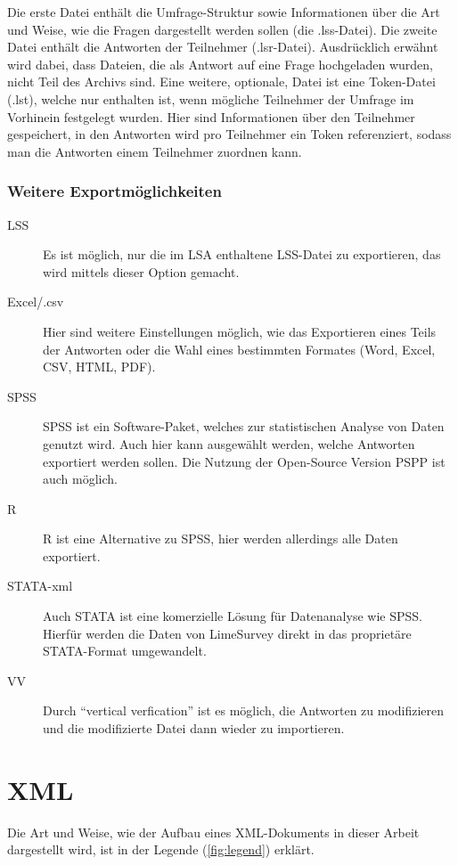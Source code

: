 Die erste Datei enthält die Umfrage-Struktur sowie Informationen über die Art und Weise, wie die Fragen dargestellt werden sollen (die .lss-Datei).
Die zweite Datei enthält die Antworten der Teilnehmer (.lsr-Datei).
Ausdrücklich erwähnt wird dabei, dass Dateien, die als Antwort auf eine Frage hochgeladen wurden, nicht Teil des Archivs sind.
Eine weitere, optionale, Datei ist eine Token-Datei (.lst), welche nur enthalten ist, wenn mögliche Teilnehmer der Umfrage im Vorhinein festgelegt wurden.
Hier sind Informationen über den Teilnehmer gespeichert, in den Antworten wird pro Teilnehmer ein Token referenziert, sodass man die Antworten einem Teilnehmer zuordnen kann.

\subsubsection{Weitere Exportmöglichkeiten}
\begin{description}
	\item[LSS] Es ist möglich, nur die im LSA enthaltene LSS-Datei zu exportieren, das wird mittels dieser Option gemacht.
	\item[Excel/.csv] Hier sind weitere Einstellungen möglich, wie das Exportieren eines Teils der Antworten oder die Wahl eines bestimmten Formates (Word, Excel, CSV, HTML, PDF).
	\item[SPSS] SPSS ist ein Software-Paket, welches zur statistischen Analyse von Daten genutzt wird. Auch hier kann ausgewählt werden, welche Antworten exportiert werden sollen. Die Nutzung der Open-Source Version PSPP ist auch möglich.
	\item[R] R ist eine Alternative zu SPSS, hier werden allerdings alle Daten exportiert.
	\item[STATA-xml] Auch STATA ist eine komerzielle Lösung für Datenanalyse wie SPSS. Hierfür werden die Daten von LimeSurvey direkt in das proprietäre STATA-Format umgewandelt.
	\item[VV] Durch \enquote{vertical verfication} ist es möglich, die Antworten zu modifizieren und die modifizierte Datei dann wieder zu importieren.
\end{description}

\section{XML}

Die Art und Weise, wie der Aufbau eines XML-Dokuments in dieser Arbeit dargestellt wird, ist in der Legende (\cref{fig:legend}) erklärt.

